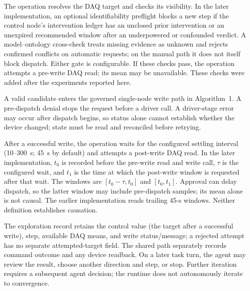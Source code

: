The operation resolves the DAQ target and checks its visibility. In the later implementation, an optional identifiability preflight blocks a new step if the control node's intervention ledger has an unclosed prior intervention or an unexpired recommended window after an underpowered or confounded verdict. A model--ontology cross-check treats missing evidence as unknown and rejects confirmed conflicts on automatic requests; on the manual path it does not itself block dispatch. Either gate is configurable. If these checks pass, the operation attempts a pre-write DAQ read; its mean may be unavailable. These checks were added after the experiments reported here.

A valid candidate enters the governed single-node write path in Algorithm~1. A pre-dispatch denial stops the request before a driver call. A driver-stage error may occur after dispatch begins, so status alone cannot establish whether the device changed; state must be read and reconciled before retrying.

After a successful write, the operation waits for the configured settling interval (10--300~s; 45~s by default) and attempts a post-write DAQ read. In the later implementation, $t_0$ is recorded before the pre-write read and write call, $\tau$ is the configured wait, and $t_1$ is the time at which the post-write window is requested after that wait. The windows are $[t_0-\tau,t_0]$ and $[t_0,t_1]$. Approval can delay dispatch, so the latter window may include pre-dispatch samples; its mean alone is not causal. The earlier implementation reads trailing 45-s windows. Neither definition establishes causation.

The exploration record retains the control value (the target after a successful write), step, available DAQ means, and write status/message; a rejected attempt has no separate attempted-target field. The shared path separately records command outcome and any device readback. On a later task turn, the agent may review the result, choose another direction and step, or stop. Further iteration requires a subsequent agent decision; the runtime does not autonomously iterate to convergence.


